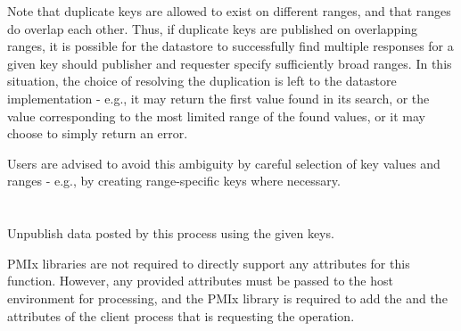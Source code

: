 \adviceuserstart
Note that duplicate keys are allowed to exist on different ranges, and that ranges do overlap each other. Thus, if duplicate keys are published on overlapping ranges, it is possible for the datastore to successfully find multiple responses for a given key should publisher and requester specify sufficiently broad ranges. In this situation, the choice of resolving the duplication is left to the datastore implementation - e.g., it may return the first value found in its search, or the value corresponding to the most limited range of the found values, or it may choose to simply return an error.

Users are advised to avoid this ambiguity by careful selection of key values and ranges - e.g., by creating range-specific keys where necessary.
\adviceuserend


\section{}

\summary

Unpublish data posted by this process using the given keys.

\format


\begin{arglist}
\end{arglist}

\returnsimple

\reqattrstart
\ac{PMIx} libraries are not required to directly support any attributes for this function. However, any provided attributes must be passed to the host environment for processing, and the \ac{PMIx} library is required to add the  and the  attributes of the client process that is requesting the operation.

\reqattrend

